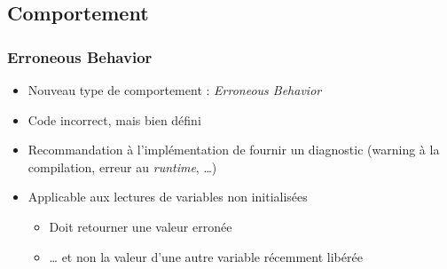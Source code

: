 \documentclass[C++.tex]{subfiles}
\begin{document}
\subsection*{Comportement}
\begin{frame}[fragile]
	\frametitle{Erroneous Behavior}
	\begin{itemize}
		\item Nouveau type de comportement : \textit{Erroneous Behavior}
		\item Code incorrect, mais bien défini
		\item Recommandation à l'implémentation de fournir un diagnostic (warning à la compilation, erreur au \textit{runtime}, \ldots{})
		\item Applicable aux lectures de variables non initialisées
		\begin{itemize}
			\item Doit retourner une valeur \og{}erronée\fg{}


			\item \ldots{} et non la valeur d'une autre variable récemment libérée
		\end{itemize}
	\end{itemize}

\end{frame}
\end{document}
